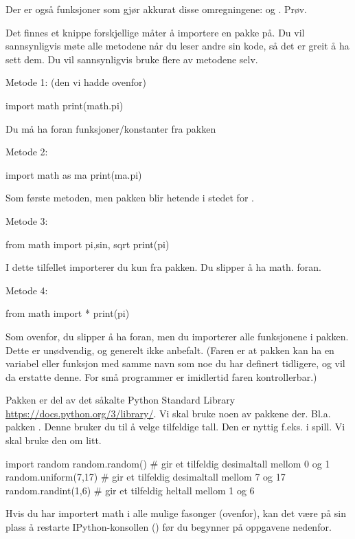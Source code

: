 Der er også funksjoner som gjør akkurat disse omregningene:   og . Prøv.

Det finnes et knippe forskjellige måter å importere en pakke på. Du vil sannsynligvis møte alle metodene når du leser andre sin kode, så det er greit å ha sett dem. Du vil sannsynligvis bruke flere av metodene selv.

Metode 1: (den vi hadde ovenfor)
\begin{usncodebox}
import math
print(math.pi)
\end{usncodebox}
Du må ha  foran funksjoner/konstanter fra pakken

Metode 2:
\begin{usncodebox}
import math as ma
print(ma.pi)
\end{usncodebox}
Som første metoden, men pakken blir hetende  i stedet for .

Metode 3:
\begin{usncodebox}
from math import pi,sin, sqrt
print(pi)
\end{usncodebox}
I dette tilfellet importerer du kun  fra pakken. Du slipper å ha math. foran. 

Metode 4:
\begin{usncodebox}
from math import *
print(pi)
\end{usncodebox}
Som ovenfor, du slipper å ha  foran, men du importerer alle funksjonene i pakken. Dette er unødvendig, og generelt ikke anbefalt. (Faren er at pakken kan ha en variabel eller funksjon med samme navn som noe du har definert tidligere, og vil da erstatte denne. For små programmer er imidlertid faren kontrollerbar.) 

Pakken  er del av det såkalte Python Standard Library \url{https://docs.python.org/3/library/}. Vi skal bruke noen av pakkene der. Bl.a. pakken . Denne bruker du til å velge tilfeldige tall. Den er nyttig f.eks. i spill. Vi skal bruke den om litt. 

\begin{usncodebox}
import random
random.random()          # gir et tilfeldig desimaltall mellom 0 og 1
random.uniform(7,17)     # gir et tilfeldig desimaltall mellom 7 og 17
random.randint(1,6)      # gir et tilfeldig heltall mellom 1 og 6
\end{usncodebox}

Hvis du har importert math i alle mulige fasonger (ovenfor), kan det være på sin plass å restarte IPython-konsollen () før du begynner på oppgavene nedenfor. 

